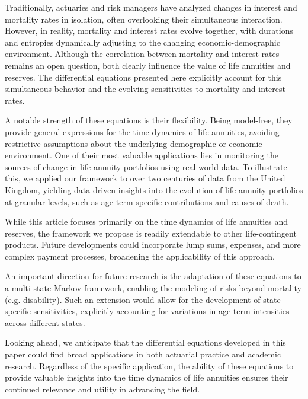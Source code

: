 \documentclass[12pt]{article}
\begin{document}
{Traditionally, actuaries and risk managers have analyzed changes in interest and mortality rates in isolation, often overlooking their simultaneous interaction. However, in reality, mortality and interest rates evolve together, with durations and entropies dynamically adjusting to the changing economic-demographic environment. Although the correlation between mortality and interest rates remains an open question, both clearly influence the value of life annuities and reserves. The differential equations presented here explicitly account for this simultaneous behavior and the evolving sensitivities to mortality and interest rates.

A notable strength of these equations is their flexibility. Being model-free, they provide general expressions for the time dynamics of life annuities, avoiding restrictive assumptions about the underlying demographic or economic environment. One of their most valuable applications lies in monitoring the sources of change in life annuity portfolios using real-world data. To illustrate this, we applied our framework to over two centuries of data from the United Kingdom, yielding data-driven insights into the evolution of life annuity portfolios at granular levels, such as age-term-specific contributions and causes of death.


While this article focuses primarily on the time dynamics of life annuities and reserves, the framework we propose is readily extendable to other life-contingent products. Future developments could incorporate lump sums, expenses, and more complex payment processes, broadening the applicability of this approach.

An important direction for future research is the adaptation of these equations to a multi-state Markov framework, enabling the modeling of risks beyond mortality (e.g. disability). Such an extension would allow for the development of state-specific sensitivities, explicitly accounting for variations in age-term intensities across different states.

Looking ahead, we anticipate that the differential equations developed in this paper could find broad applications in both actuarial practice and academic research. Regardless of the specific application, the ability of these equations to provide valuable insights into the time dynamics of life annuities ensures their continued relevance and utility in advancing the field.

\newpage


%
%

}
\end{document}
